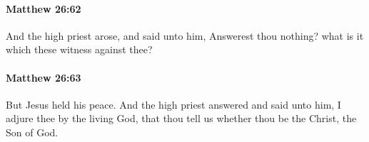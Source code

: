 		\paragraph{Matthew 26:62} %
			\label{MATTHEW-26-62}

			And the high priest arose, and said unto him, Answerest thou nothing? what is it which these witness against thee?

			\begin{framed}
			\scriptsize
				\begin{compactdesc}
					\item[SBLG] 
				\end{compactdesc}
			\end{framed}

		\paragraph{Matthew 26:63} %
			\label{MATTHEW-26-63}

			But Jesus held his peace. And the high priest answered and said unto him, I adjure thee by the living God, that thou tell us whether thou be the Christ, the Son of God.

